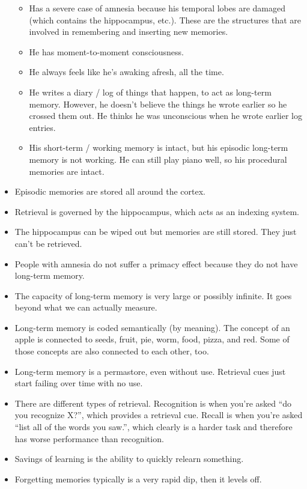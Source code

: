 \documentclass[]{article}
\begin{document}
\begin{itemize}
\begin{itemize}
						\item Has a severe case of amnesia because his temporal lobes are damaged (which contains the hippocampus, etc.). These are the structures that are involved in remembering and inserting new memories.
						\item He has moment-to-moment consciousness.
						\item He always feels like he's awaking afresh, all the time.
						\item He writes a diary / log of things that happen, to act as long-term memory. However, he doesn't believe the things he wrote earlier so he crossed them out. He thinks he was unconscious when he wrote earlier log entries.
						\item His short-term / working memory is intact, but his episodic long-term memory is not working. He can still play piano well, so his procedural memories are intact.
					\end{itemize}
				\item Episodic memories are stored all around the cortex.
				\item Retrieval is governed by the hippocampus, which acts as an indexing system.
				\item The hippocampus can be wiped out but memories are still stored. They just can't be retrieved.
				\item People with amnesia do not suffer a primacy effect because they do not have long-term memory.
				\item The capacity of long-term memory is very large or possibly infinite. It goes beyond what we can actually measure.
				\item Long-term memory is coded semantically (by meaning). The concept of an apple is connected to seeds, fruit, pie, worm, food, pizza, and red. Some of those concepts are also connected to each other, too.
				\item Long-term memory is a permastore, even without use. Retrieval cues just start failing over time with no use.
				\item There are different types of retrieval. Recognition is when you're asked ``do you recognize X?'', which provides a retrieval cue. Recall is when you're asked ``list all of the words you saw.'', which clearly is a harder task and therefore has worse performance than recognition.
				\item Savings of learning is the ability to quickly relearn something.
				\item Forgetting memories typically is a very rapid dip, then it levels off.

\end{itemize}
\end{document}
